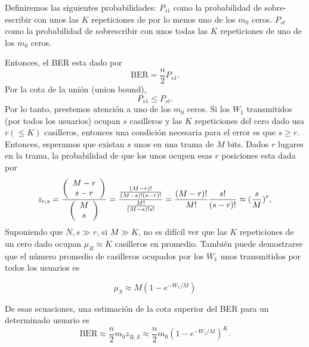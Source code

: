Definiremos las siguientes probabilidades: 
$P_{s1}$ como la probabilidad de sobre-escribir con unos las $K$ repeticiones de por lo menos uno de los $m_0$ ceros.
$P_{st}$ como la probabilidad de sobrescribir con unos todas las $K$ repeticiones de uno de los $m_0$ ceros.

Entonces, el BER esta dado por
\begin{equation}
\text{BER} = \frac{n}{2}P_{s1}.
\label{eq:ber_01}
\end{equation}
Por la cota de la unión (union bound), 
\begin{equation}
P_{s1}\leq P_{st}.
\label{eq:union_bound}
\end{equation}
Por lo tanto, prestemos atención a uno de los $m_0$ ceros. Si los $W_{1}$ transmitidos (por todos los usuarios) ocupan $s$ casilleros y las $K$ repeticiones del cero dado usa $r ( \leq K)$ casilleros, entonces una condición necesaria para el error es que $s \geq r$. Entonces, esperamos que existan $s$ unos en una trama de $M$ bits. Dados $r$ lugares en la trama, la probabilidad de que los unos ocupen esas $r$ posiciones esta dada por 
\begin{equation}
z_{r,s} = \frac{\left(\begin{array}{c} M-r \\ s-r\end{array}\right)}{\left(\begin{array}{c} M \\ s\end{array}\right)}= \frac{\frac{(M-r)!}{(M-s)! (s-r)!}}{\frac{M!}{(M-s)!s!}} = \frac{(M-r)!}{M!}\frac{s!}{(s-r)!}\approx (\frac{s}{M})^r,
\end{equation}
Suponiendo que $N,s\gg r$, si $M \gg K$, no es difícil ver que las $K$ repeticiones de un cero dado ocupan $\mu_{R} \approx K$ casilleros en promedio. También puede demostrarse que el número promedio de casilleros ocupados por los $W_{1}$ unos transmitidos por todos los usuarios es

\begin{equation}
\mu_{S} \approx M (1-e^{-W_1/M})
\end{equation}
 
De esas ecuaciones, una estimación de la cota superior del BER para un determinado usuario es
\begin{equation}
\text{BER} \approx \frac{n}{2} m_0 z_{\bar{R},\bar{S}} \approx \frac{n}{2} m_0 \left(1-e^{-W_1/M}\right)^K.
\end{equation}

